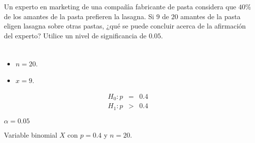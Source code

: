 \begin{enunciado}
 Un experto en marketing de una compa\~n\'{\i}a fabricante de pasta
 considera que $40\%$ de los amantes de la pasta prefieren la lasagna.
 Si $9$ de $20$ amantes de la pasta eligen lasagna sobre otras pastas,
 ¿qu\'e se puede concluir acerca de la afirmaci\'on del experto?
 Utilice un nivel de significancia de $0.05$.
\end{enunciado}

\begin{solucion}
 \begin{datos}
  $\phantom{0}$
  \begin{itemize}
   \item $n = 20$.
   \item $x = 9$.
  \end{itemize}
 \end{datos}

 \begin{hipotesis}
  \begin{eqnarray*}
   H_0: p & = & 0.4 \\
   H_1: p & > & 0.4
  \end{eqnarray*}
 \end{hipotesis}

 \begin{significancia}
  $\alpha = 0.05$
 \end{significancia}

 \begin{estadistico}
  Variable binomial $X$ con $p = 0.4$ y $n = 20$.
 \end{estadistico}


\end{solucion}
